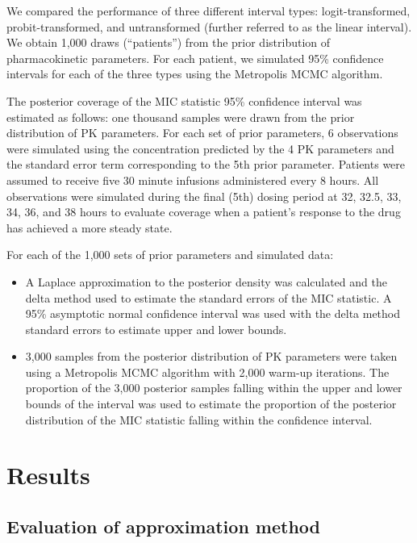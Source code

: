 \documentclass{article}\usepackage[]{graphicx}\usepackage[]{color}
\begin{document}
	We compared the performance of three different interval types: logit-transformed, probit-transformed, and untransformed (further referred to as the linear interval). We obtain 1,000 draws (``patients'') from the prior distribution of pharmacokinetic parameters. For each patient, we simulated 95\% confidence intervals for each of the three types using the Metropolis MCMC algorithm.

The posterior coverage of the MIC statistic 95\% confidence interval was estimated as follows: one thousand samples were drawn from the prior distribution of PK parameters. For each set of prior parameters, 6 observations were simulated using the concentration predicted by the 4 PK parameters and the standard error term corresponding to the 5th prior parameter. Patients were assumed to receive five 30 minute infusions administered every 8 hours. All observations were simulated during the final (5th) dosing period at 32, 32.5, 33, 34, 36, and 38 hours to evaluate coverage when a patient's response to the drug has achieved a more steady state.

For each of the 1,000 sets of prior parameters and simulated data:

\begin{itemize}
	 \item A Laplace approximation to the posterior density was calculated and the delta method used to estimate the standard errors of the MIC statistic. A 95\% asymptotic normal confidence interval was used with the delta method standard errors to estimate upper and lower bounds.
	 \item 3,000 samples from the posterior distribution of PK parameters were taken using a Metropolis MCMC algorithm with 2,000 warm-up iterations. The proportion of the 3,000 posterior samples falling within the upper and lower bounds of the interval was used to estimate the proportion of the posterior distribution of the MIC statistic falling within the confidence interval.
\end{itemize}

\section{Results}

\subsection{Evaluation of approximation method}
\end{document}
